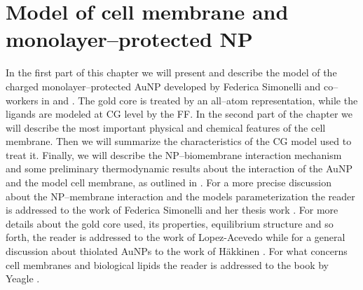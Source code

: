 \chapter{Model of cell membrane and monolayer--protected NP}
\label{chap:membraneNP}
In the first part of this chapter we will present and describe the model of the charged monolayer--protected 
\ac{AuNP} developed by Federica Simonelli and co--workers in \cite{simonelliThesis} and \cite{ourPaper}. The 
gold core is treated by an all--atom representation, while the ligands are modeled at \ac{CG} level by the 
\martini{} \ac{FF}. In the second part of the chapter we will describe the most important physical and chemical 
features of the cell membrane. Then we will summarize the characteristics of the \ac{CG} model used to treat 
it. Finally, we will describe the \ac{NP}--biomembrane interaction mechanism and some preliminary thermodynamic 
results about the interaction of the \ac{AuNP} and the model cell membrane, as outlined in \cite{ourPaper}. For 
a more precise discussion about the \ac{NP}--membrane interaction and the models parameterization the reader is 
addressed to the work of Federica Simonelli \etal{} \cite{ourPaper} and her thesis work \cite{simonelliThesis}. 
For more details about the gold core used, its properties, equilibrium structure and so forth, the reader is 
addressed to the work of Lopez-Acevedo \etal{} \cite{clusterEquilibrium} while for a general discussion about 
thiolated \acp{AuNP} to the work of Häkkinen \cite{corePassivated}. For what concerns cell membranes and 
biological lipids the reader is addressed to the book by Yeagle \cite{yeagle}.


